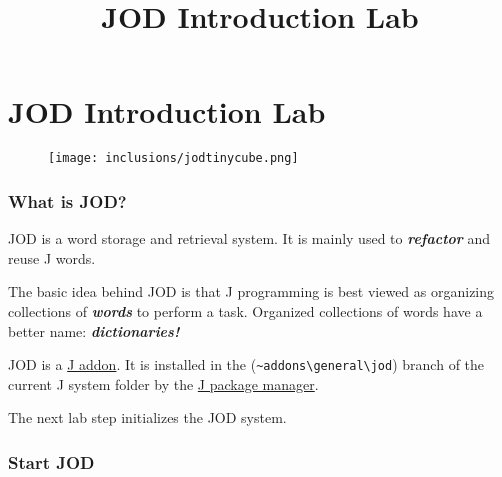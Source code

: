 \documentclass[11pt,letter,landscape]{article}
\title{JOD Introduction Lab}
\makeatletter
\def\maxwidth{\ifdim\Gin@nat@width>\linewidth\linewidth
    \else\Gin@nat@width\fi}
\let\Oldincludegraphics\includegraphics
\renewcommand{\includegraphics}[1]{\Oldincludegraphics[width=.8\maxwidth]{#1}}
\makeatother
\begin{document}
    
    
    \maketitle
    
    

    
    \section{JOD Introduction Lab}\label{jod-introduction-lab}

\begin{figure}
\centering
\texttt{[image: inclusions/jodtinycube.png]}
\caption{}
\end{figure}

    \subsubsection{What is JOD?}\label{what-is-jod}

JOD is a word storage and retrieval system. It is mainly used to
\textbf{\emph{refactor}} and reuse J words.

The basic idea behind JOD is that J programming is best viewed as
organizing collections of \textbf{\emph{words}} to perform a task.
Organized collections of words have a better name:
\textbf{\emph{dictionaries!}}

JOD is a \href{https://code.jsoftware.com/wiki/JAL/User_Guide}{J addon}.
It is installed in the
(\texttt{\textasciitilde{}addons\textbackslash{}general\textbackslash{}jod})
branch of the current J system folder by the
\href{https://code.jsoftware.com/wiki/JAL/Package_Manager}{J package
manager}.

The next lab step initializes the JOD system.

    \subsubsection{Start JOD}\label{start-jod}
\end{document}

